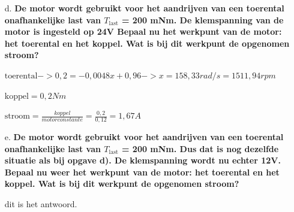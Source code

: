 \begin{enumerate}
\item [d.] \textbf{De motor wordt gebruikt voor het aandrijven van een toerental onafhankelijke
    last van $T_{\text{last}}$ = 200 mNm. De klemspanning van de motor is ingesteld op 24V
    Bepaal nu het werkpunt van de motor: het toerental en het koppel. Wat is bij dit werkpunt de opgenomen stroom?}     

        $\text{toerental} -> 0,2=-0,0048x + 0,96 -> x = 158,33 rad/s = 1511,94 rpm $
    
        $\text{koppel} = 0,2 Nm$
        
        $\text{stroom} = \frac{koppel}{motorconstante} = \frac{0,2}{0,12} = 1,67 A$

    \item [e.] \textbf{De motor wordt gebruikt voor het aandrijven van een toerental onafhankelijke
    last van $T_{\text{last}}$ = 200 mNm. Dus dat is nog dezelfde situatie als bij opgave d).
    De klemspanning wordt nu echter 12V.
    Bepaal nu weer het werkpunt van de motor: het toerental en het koppel.
    Wat is bij dit werkpunt de opgenomen stroom?}

        dit is het antwoord.

\end{enumerate}
